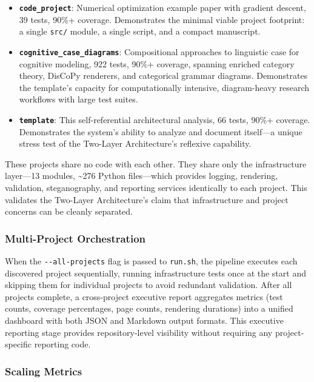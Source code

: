 \documentclass[
]{article}
\providecommand{\tightlist}{%
  \setlength{\itemsep}{0pt}\setlength{\parskip}{0pt}}
\begin{document}
\begin{itemize}
\tightlist
\item
  \textbf{\texttt{code\_project}}: Numerical optimization example paper
  with gradient descent, 39 tests, 90\%+ coverage. Demonstrates the
  minimal viable project footprint: a single \texttt{src/} module, a
  single script, and a compact manuscript.
\item
  \textbf{\texttt{cognitive\_case\_diagrams}}: Compositional approaches
  to linguistic case for cognitive modeling, 922 tests, 90\%+ coverage,
  spanning enriched category theory, DisCoPy renderers, and categorical
  grammar diagrams. Demonstrates the template's capacity for
  computationally intensive, diagram-heavy research workflows with large
  test suites.
\item
  \textbf{\texttt{template}}: This self-referential architectural
  analysis, 66 tests, 90\%+ coverage. Demonstrates the system's ability
  to analyze and document itself---a unique stress test of the Two-Layer
  Architecture's reflexive capability.
\end{itemize}

These projects share no code with each other. They share only the
infrastructure layer---13 modules, \textasciitilde276 Python
files---which provides logging, rendering, validation, steganography,
and reporting services identically to each project. This validates the
Two-Layer Architecture's claim that infrastructure and project concerns
can be cleanly separated.

\subsubsection{Multi-Project
Orchestration}\label{multi-project-orchestration}

When the \texttt{-\/-all-projects} flag is passed to \texttt{run.sh},
the pipeline executes each discovered project sequentially, running
infrastructure tests once at the start and skipping them for individual
projects to avoid redundant validation. After all projects complete, a
cross-project executive report aggregates metrics (test counts, coverage
percentages, page counts, rendering durations) into a unified dashboard
with both JSON and Markdown output formats. This executive reporting
stage provides repository-level visibility without requiring any
project-specific reporting code.

\subsubsection{Scaling Metrics}\label{scaling-metrics}
\end{document}
